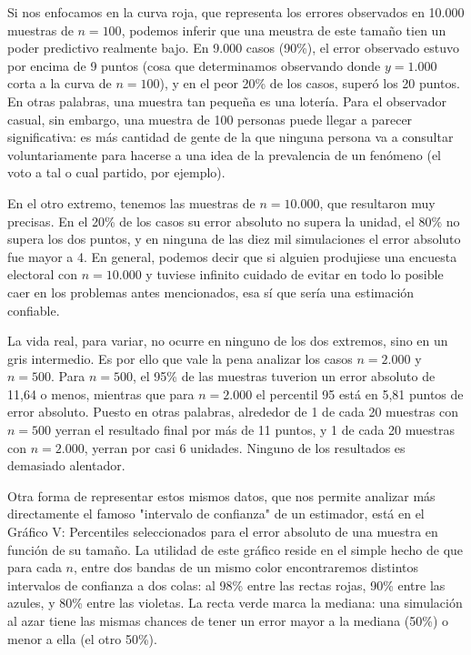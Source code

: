 \documentclass[12pt, a4paper]{article}
\begin{document}
Si nos enfocamos en la curva roja, que representa los errores observados en 10.000 muestras de $n=100$, podemos inferir que una meustra de este tama\~no tien un poder predictivo realmente bajo. En 9.000 casos (90\%), el error observado estuvo por encima de 9 puntos (cosa que determinamos observando donde $y=1.000$ corta a la curva de $n=100$), y en el peor 20\% de los casos, super\'o los 20 puntos. En otras palabras, una muestra tan peque\~na es una loter\'ia.
Para el observador casual, sin embargo, una muestra de 100 personas puede llegar a parecer significativa: es m\'as cantidad de gente de la que ninguna persona va a consultar voluntariamente para hacerse a una idea de la prevalencia de un fen\'omeno (el voto a tal o cual partido, por ejemplo). 

En el otro extremo, tenemos las muestras de $n=10.000$, que resultaron muy precisas. En el 20\% de los casos su error absoluto no supera la unidad, el 80\% no supera los dos puntos, y en ninguna de las diez mil simulaciones el error absoluto fue mayor a 4. En general, podemos decir que si alguien produjiese una encuesta electoral con $n=10.000$ y tuviese infinito cuidado de evitar en todo lo posible caer en los problemas antes mencionados, esa s\'i que ser\'ia una estimaci\'on confiable.

La vida real, para variar, no ocurre en ninguno de los dos extremos, sino en un gris intermedio. Es por ello que vale la pena analizar los casos $n=2.000$ y $n=500$. Para $n=500$, el 95\% de las muestras tuverion un error absoluto de 11,64 o menos, mientras que para $n=2.000$ el percentil 95 est\'a en 5,81 puntos de error absoluto. Puesto en otras palabras, alrededor de 1 de cada 20 muestras con $n=500$ yerran el resultado final por m\'as de 11 puntos, y 1 de cada 20 muestras con $n=2.000$, yerran por casi 6 unidades. Ninguno de los resultados es demasiado alentador.

Otra forma de representar estos mismos datos, que nos permite analizar m\'as directamente el famoso "intervalo de confianza" de un estimador, est\'a en el Gr\'afico V: Percentiles seleccionados para el error absoluto de una muestra en funci\'on de su tama\~no.
La utilidad de este gr\'afico reside en el simple hecho de que para cada $n$, entre dos bandas de un mismo color encontraremos distintos intervalos de confianza a dos colas: al 98\% entre las rectas rojas, 90\% entre las azules, y 80\% entre las violetas. La recta verde marca la mediana: una simulaci\'on al azar tiene las mismas chances de tener un error mayor a la mediana (50\%) o menor a ella (el otro 50\%).
\end{document}
